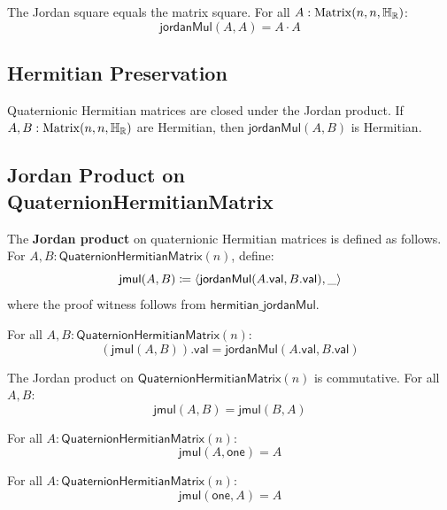 \begin{theorem}
The Jordan square equals the matrix square. For all $A : \mathrm{Matrix}(n, n, \mathbb{H}_{\mathbb{R}})$:
\[ \mathsf{jordanMul}(A, A) = A \cdot A \]
\end{theorem}

\subsection{Hermitian Preservation}

\begin{theorem}
Quaternionic Hermitian matrices are closed under the Jordan product. If $A, B : \mathrm{Matrix}(n, n, \mathbb{H}_{\mathbb{R}})$ are Hermitian, then $\mathsf{jordanMul}(A, B)$ is Hermitian.
\end{theorem}

\subsection{Jordan Product on QuaternionHermitianMatrix}

\begin{definition}[jmul]
The \textbf{Jordan product} on quaternionic Hermitian matrices is defined as follows. For $A, B : \mathsf{QuaternionHermitianMatrix}(n)$, define:
\[ \mathsf{jmul}(A, B) \coloneqq \langle \mathsf{jordanMul}(A.\mathsf{val}, B.\mathsf{val}), \_ \rangle \]
where the proof witness follows from $\mathsf{hermitian\_jordanMul}$.
\end{definition}

\begin{lemma}
For all $A, B : \mathsf{QuaternionHermitianMatrix}(n)$:
\[ (\mathsf{jmul}(A, B)).\mathsf{val} = \mathsf{jordanMul}(A.\mathsf{val}, B.\mathsf{val}) \]
\end{lemma}

\begin{theorem}
The Jordan product on $\mathsf{QuaternionHermitianMatrix}(n)$ is commutative. For all $A, B$:
\[ \mathsf{jmul}(A, B) = \mathsf{jmul}(B, A) \]
\end{theorem}

\begin{theorem}
For all $A : \mathsf{QuaternionHermitianMatrix}(n)$:
\[ \mathsf{jmul}(A, \mathsf{one}) = A \]
\end{theorem}

\begin{theorem}
For all $A : \mathsf{QuaternionHermitianMatrix}(n)$:
\[ \mathsf{jmul}(\mathsf{one}, A) = A \]
\end{theorem}
